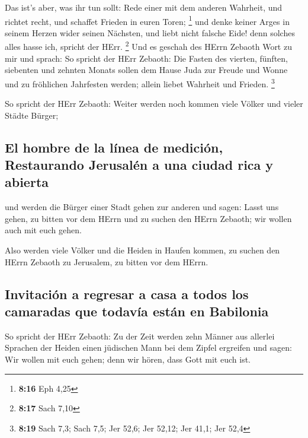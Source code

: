 Das ist's aber, was ihr tun sollt: Rede einer mit dem anderen Wahrheit,
und richtet recht, und schaffet Frieden in euren Toren; \footnote{\textbf{8:16}
  Eph 4,25}  und denke keiner Arges in seinem Herzen
wider seinen Nächsten, und liebt nicht falsche Eide! denn solches alles
hasse ich, spricht der HErr. \footnote{\textbf{8:17} Sach 7,10}
 Und es geschah des HErrn Zebaoth Wort zu mir und sprach:
 So spricht der HErr Zebaoth: Die Fasten des vierten,
fünften, siebenten und zehnten Monats sollen dem Hause Juda zur Freude
und Wonne und zu fröhlichen Jahrfesten werden; allein liebet Wahrheit
und Frieden. \footnote{\textbf{8:19} Sach 7,3; Sach 7,5; Jer 52,6; Jer
  52,12; Jer 41,1; Jer 52,4}

 So spricht der HErr Zebaoth: Weiter werden noch kommen
viele Völker und vieler Städte Bürger;

\hypertarget{el-hombre-de-la-luxednea-de-mediciuxf3n-restaurando-jerusaluxe9n-a-una-ciudad-rica-y-abierta}{%
\subsection{El hombre de la línea de medición, Restaurando Jerusalén a
una ciudad rica y
abierta}\label{el-hombre-de-la-luxednea-de-mediciuxf3n-restaurando-jerusaluxe9n-a-una-ciudad-rica-y-abierta}}

 und werden die Bürger einer Stadt gehen zur anderen und
sagen: Lasst uns gehen, zu bitten vor dem HErrn und zu suchen den HErrn
Zebaoth; wir wollen auch mit euch gehen.

 Also werden viele Völker und die Heiden in Haufen
kommen, zu suchen den HErrn Zebaoth zu Jerusalem, zu bitten vor dem
HErrn.

\hypertarget{invitaciuxf3n-a-regresar-a-casa-a-todos-los-camaradas-que-todavuxeda-estuxe1n-en-babilonia}{%
\subsection{Invitación a regresar a casa a todos los camaradas que
todavía están en
Babilonia}\label{invitaciuxf3n-a-regresar-a-casa-a-todos-los-camaradas-que-todavuxeda-estuxe1n-en-babilonia}}

 So spricht der HErr Zebaoth: Zu der Zeit werden zehn
Männer aus allerlei Sprachen der Heiden einen jüdischen Mann bei dem
Zipfel ergreifen und sagen: Wir wollen mit euch gehen; denn wir hören,
dass Gott mit euch ist.


